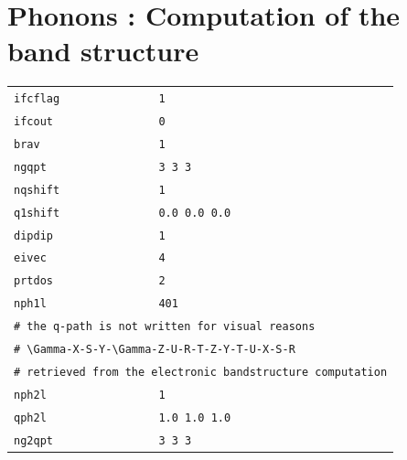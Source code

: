 \documentclass[11pt,a4paper]{article}
\begin{document}
\section{Phonons : Computation of the band structure}
\begin{center}
\begin{tabular}{lll}
\texttt{ifcflag}&\texttt{1}&\\
\texttt{ifcout}&\texttt{0}&\\
\texttt{brav}&\texttt{1}&\\
\texttt{ngqpt}&\texttt{3 3 3}&\\
\texttt{nqshift}&\texttt{1}&\\
\texttt{q1shift}&\texttt{0.0 0.0 0.0}&\\
\texttt{dipdip}&\texttt{1}&\\
\texttt{eivec}&\texttt{4}&\\
\texttt{prtdos}&\texttt{2}&\\
\texttt{nph1l}&\texttt{401}&\\
\multicolumn{3}{l}{\texttt{\# the q-path is not written for visual reasons}}\\
\multicolumn{3}{l}{\texttt{\# \textbackslash Gamma-X-S-Y-\textbackslash Gamma-Z-U-R-T-Z-Y-T-U-X-S-R}}\\
\multicolumn{3}{l}{\texttt{\# retrieved from the electronic bandstructure computation}}\\
\texttt{nph2l}&\texttt{1}&\\
\texttt{qph2l}&\texttt{1.0 1.0 1.0}&\\
\texttt{ng2qpt}&\texttt{3 3 3}&\\
\end{tabular}
\end{center}
\end{document}
